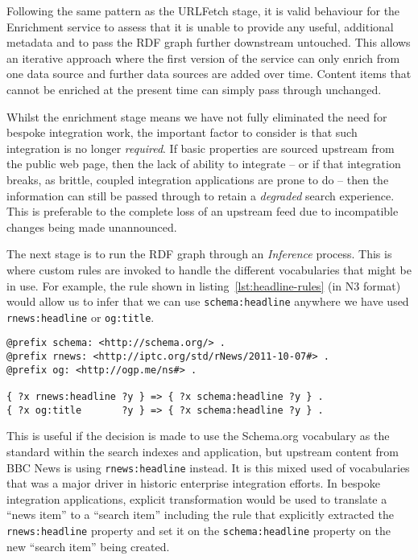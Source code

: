 Following the same pattern as the URLFetch stage, it is valid behaviour
for the Enrichment service to assess that it is unable to provide
any useful, additional metadata and to pass the RDF graph further
downstream untouched. This allows an iterative approach where the first
version of the service can only enrich from one data source and
further data sources are added over time. Content items that cannot be
enriched at the present time can simply pass through unchanged.

Whilst the enrichment stage means we have not fully eliminated the
need for bespoke integration work, the important factor to consider is that
such integration is no longer \emph{required}. If basic properties
are sourced upstream from the public web page, then the lack
of ability to integrate -- or if that integration breaks, as brittle,
coupled integration applications are prone to do -- then the information
can still be passed through to retain a \emph{degraded} search
experience. This is preferable to the complete loss of an upstream feed
due to incompatible changes being made unannounced.

The next stage is to run the RDF graph through an \emph{Inference} process.
This is where custom rules are invoked to handle the different
vocabularies that might be in use. For example, the rule shown in
listing~\ref{lst:headline-rules}
(in N3 format) would allow us to infer that we can
use \texttt{schema:headline} anywhere we have used \texttt{rnews:headline}
or \texttt{og:title}.

\begin{centering}
\begin{lstlisting}[language=ttl,label=lst:headline-rules,caption=Simple inference rules to derive a suitable headline from two different vocabularies.]
@prefix schema: <http://schema.org/> .
@prefix rnews: <http://iptc.org/std/rNews/2011-10-07#> .
@prefix og: <http://ogp.me/ns#> .

{ ?x rnews:headline ?y } => { ?x schema:headline ?y } .
{ ?x og:title       ?y } => { ?x schema:headline ?y } .
\end{lstlisting}
\end{centering}

This is useful if the decision is made to use the Schema.org vocabulary as
the standard within the search indexes and application, but upstream
content from BBC News is using \texttt{rnews:headline} instead. It is this
mixed used of vocabularies that was a major driver in historic
enterprise integration efforts. In bespoke integration applications, explicit
transformation would be used to translate a ``news item'' to a
``search item'' including the rule that explicitly extracted the
\texttt{rnews:headline} property and set it on the \texttt{schema:headline}
property on the new ``search item'' being created.

